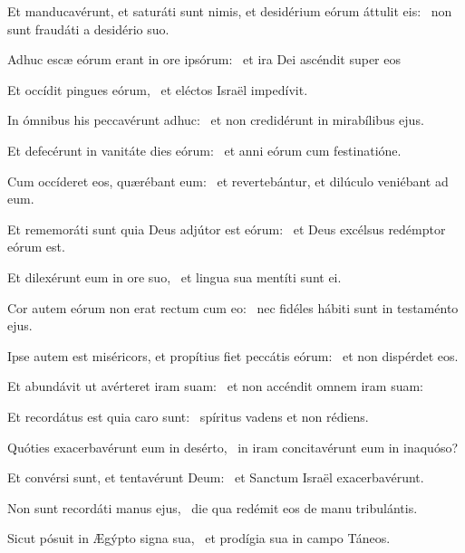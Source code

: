 \item Et manducavérunt, et saturáti sunt nimis, et desidérium eórum áttulit eis:~\psstar{} non sunt fraudáti a desidério suo.

\item Adhuc escæ eórum erant in ore ipsórum:~\psstar{} et ira Dei ascéndit super eos

\item Et occídit pingues eórum,~\psstar{} et eléctos Israël impedívit.

\item In ómnibus his peccavérunt adhuc:~\psstar{} et non credidérunt in mirabílibus ejus.

\item Et defecérunt in vanitáte dies eórum:~\psstar{} et anni eórum cum festinatióne.

\item Cum occíderet eos, quærébant eum:~\psstar{} et revertebántur, et dilúculo veniébant ad eum.

\item Et rememoráti sunt quia Deus adjútor est eórum:~\psstar{} et Deus excélsus redémptor eórum est.

\item Et dilexérunt eum in ore suo,~\psstar{} et lingua sua mentíti sunt ei.

\item Cor autem eórum non erat rectum cum eo:~\psstar{} nec fidéles hábiti sunt in testaménto ejus.

\item Ipse autem est miséricors, et propítius fiet peccátis eórum:~\psstar{} et non dispérdet eos.

\item Et abundávit ut avérteret iram suam:~\psstar{} et non accéndit omnem iram suam:

\item Et recordátus est quia caro sunt:~\psstar{} spíritus vadens et non rédiens.

\item Quóties exacerbavérunt eum in desérto,~\psstar{} in iram concitavérunt eum in inaquóso?

\item Et convérsi sunt, et tentavérunt Deum:~\psstar{} et Sanctum Israël exacerbavérunt.

\item Non sunt recordáti manus ejus,~\psstar{} die qua redémit eos de manu tribulántis.

\item Sicut pósuit in Ægýpto signa sua,~\psstar{} et prodígia sua in campo Táneos.

